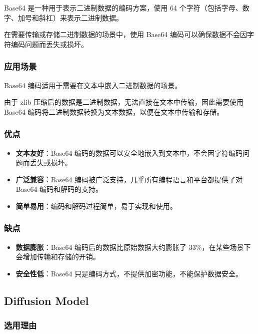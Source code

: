 \documentclass{ctexart}
\begin{document}
Base64 是一种用于表示二进制数据的编码方案，使用 64 个字符（包括字母、数字、加号和斜杠）来表示二进制数据。

在需要传输或存储二进制数据的场景中，使用 Base64 编码可以确保数据不会因字符编码问题而丢失或损坏。

\subsubsection{应用场景}

Base64 编码适用于需要在文本中嵌入二进制数据的场景。

由于 zlib 压缩后的数据是二进制数据，无法直接在文本中传输，因此需要使用 Base64 编码将二进制数据转换为文本数据，以便在文本中传输和存储。

\subsubsection{优点}

\begin{itemize}
    \item \textbf{文本友好}：Base64 编码的数据可以安全地嵌入到文本中，不会因字符编码问题而丢失或损坏。
    \item \textbf{广泛兼容}：Base64 编码被广泛支持，几乎所有编程语言和平台都提供了对 Base64 编码和解码的支持。
    \item \textbf{简单易用}：编码和解码过程简单，易于实现和使用。
\end{itemize}

\subsubsection{缺点}

\begin{itemize}
    \item \textbf{数据膨胀}：Base64 编码后的数据比原始数据大约膨胀了 33\%，在某些场景下会增加传输和存储的开销。
    \item \textbf{安全性低}：Base64 只是编码方式，不提供加密功能，不能保护数据安全。
\end{itemize}

\subsection{Diffusion Model}

\subsubsection{选用理由}
\end{document}
